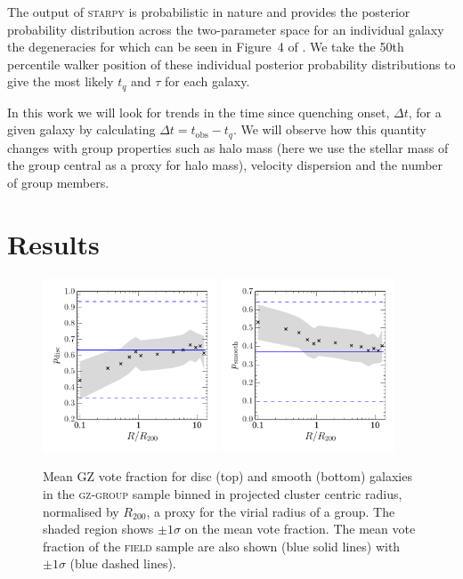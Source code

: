 \documentclass[useAMS,usenatbib]{mn2e}
\def\starpy ~{\textsc{starpy}}
\begin{document}
The output of \starpy  ~ is probabilistic in nature and provides the posterior probability distribution across the two-parameter space for an individual galaxy the degeneracies for which can be seen in Figure~4 of \citet{smethurst15}. We take the 50th percentile walker position of these individual posterior probability distributions to give the most likely $t_{q}$ and $\tau$ for each galaxy. 

In this work we will look for trends in the time since quenching onset, $\Delta t$, for a given galaxy by calculating $\Delta t = t_\mathrm{obs} - t_{q}$. We will observe how this quantity changes with group properties such as halo mass (here we use the stellar mass of the group central as a proxy for halo mass), velocity dispersion and the number of group members. 

\section{Results}\label{sec:results}

\begin{figure}
\includegraphics[width=0.46\textwidth]{p_disc_trend_with_log_radius_field_compare.pdf}
\includegraphics[width=0.46\textwidth]{p_smooth_trend_with_log_radius_field_compare.pdf}
\caption{Mean GZ vote fraction for disc (top) and smooth (bottom) galaxies in the \textsc{gz-group} sample binned in projected cluster centric radius, normalised by $R_{200}$, a proxy for the virial radius of a group. The shaded region shows $\pm1\sigma$ on the mean vote fraction. The mean vote fraction of the \textsc{field} sample are also shown (blue solid lines) with $\pm1\sigma$ (blue dashed lines).}
\label{fig:morphradius}
\end{figure}
\end{document}
